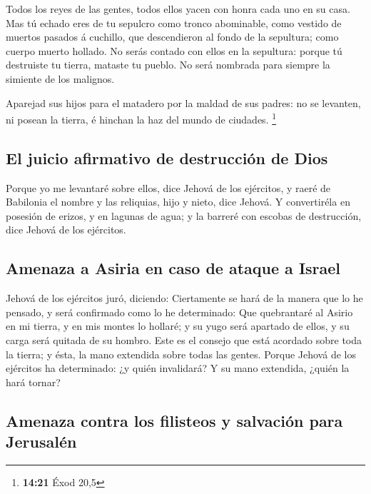  Todos los reyes de las gentes, todos ellos yacen con
honra cada uno en su casa.  Mas tú echado eres de tu
sepulcro como tronco abominable, como vestido de muertos pasados á
cuchillo, que descendieron al fondo de la sepultura; como cuerpo muerto
hollado.  No serás contado con ellos en la sepultura:
porque tú destruiste tu tierra, mataste tu pueblo. No será nombrada para
siempre la simiente de los malignos.

 Aparejad sus hijos para el matadero por la maldad de sus
padres: no se levanten, ni posean la tierra, é hinchan la haz del mundo
de ciudades. \footnote{\textbf{14:21} Éxod 20,5}

\hypertarget{el-juicio-afirmativo-de-destrucciuxf3n-de-dios}{%
\subsection{El juicio afirmativo de destrucción de
Dios}\label{el-juicio-afirmativo-de-destrucciuxf3n-de-dios}}

 Porque yo me levantaré sobre ellos, dice Jehová de los
ejércitos, y raeré de Babilonia el nombre y las reliquias, hijo y nieto,
dice Jehová.  Y convertiréla en posesión de erizos, y en
lagunas de agua; y la barreré con escobas de destrucción, dice Jehová de
los ejércitos.

\hypertarget{amenaza-a-asiria-en-caso-de-ataque-a-israel}{%
\subsection{Amenaza a Asiria en caso de ataque a
Israel}\label{amenaza-a-asiria-en-caso-de-ataque-a-israel}}

 Jehová de los ejércitos juró, diciendo: Ciertamente se
hará de la manera que lo he pensado, y será confirmado como lo he
determinado:  Que quebrantaré al Asirio en mi tierra, y
en mis montes lo hollaré; y su yugo será apartado de ellos, y su carga
será quitada de su hombro.  Este es el consejo que está
acordado sobre toda la tierra; y ésta, la mano extendida sobre todas las
gentes.  Porque Jehová de los ejércitos ha determinado:
¿y quién invalidará? Y su mano extendida, ¿quién la hará tornar?

\hypertarget{amenaza-contra-los-filisteos-y-salvaciuxf3n-para-jerusaluxe9n}{%
\subsection{Amenaza contra los filisteos y salvación para
Jerusalén}\label{amenaza-contra-los-filisteos-y-salvaciuxf3n-para-jerusaluxe9n}}

